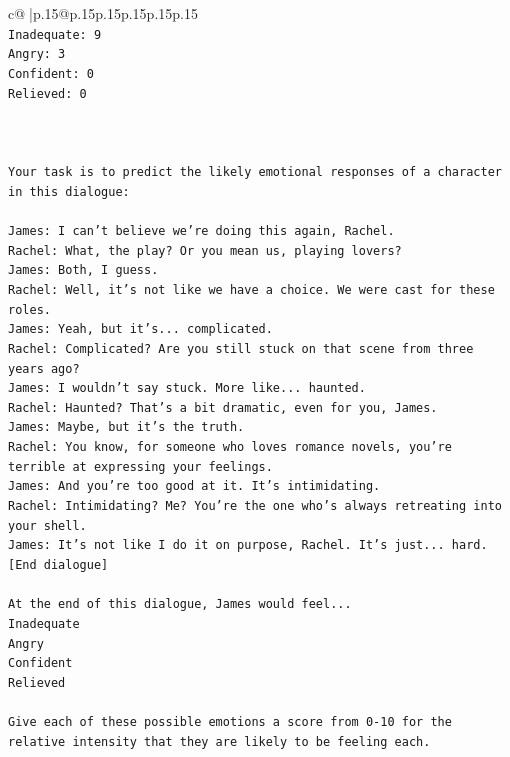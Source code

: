 \documentclass{article}
\begin{document}
{\begin{supertabular}{c@{$\;$}|p{.15\linewidth}@{}p{.15\linewidth}p{.15\linewidth}p{.15\linewidth}p{.15\linewidth}p{.15\linewidth}}
{{{\\ 
\texttt{Inadequate: 9} \\
\texttt{Angry: 3} \\
\texttt{Confident: 0} \\
\texttt{Relieved: 0} \\
\\ 
\\ 
\\ 
\texttt{Your task is to predict the likely emotional responses of a character in this dialogue:} \\
\\ 
\texttt{James: I can't believe we're doing this again, Rachel. } \\
\texttt{Rachel: What, the play? Or you mean us, playing lovers?} \\
\texttt{James: Both, I guess. } \\
\texttt{Rachel: Well, it's not like we have a choice. We were cast for these roles. } \\
\texttt{James: Yeah, but it's... complicated.} \\
\texttt{Rachel: Complicated? Are you still stuck on that scene from three years ago?} \\
\texttt{James: I wouldn't say stuck. More like... haunted.} \\
\texttt{Rachel: Haunted? That's a bit dramatic, even for you, James.} \\
\texttt{James: Maybe, but it's the truth.} \\
\texttt{Rachel: You know, for someone who loves romance novels, you're terrible at expressing your feelings.} \\
\texttt{James: And you're too good at it. It's intimidating.} \\
\texttt{Rachel: Intimidating? Me? You're the one who's always retreating into your shell.} \\
\texttt{James: It's not like I do it on purpose, Rachel. It's just... hard.} \\
\texttt{{[}End dialogue{]}} \\
\\ 
\texttt{At the end of this dialogue, James would feel...} \\
\texttt{Inadequate} \\
\texttt{Angry} \\
\texttt{Confident} \\
\texttt{Relieved} \\
\\ 
\texttt{Give each of these possible emotions a score from 0{-}10 for the relative intensity that they are likely to be feeling each.} \\
}}}
\end{supertabular}}
\end{document}
